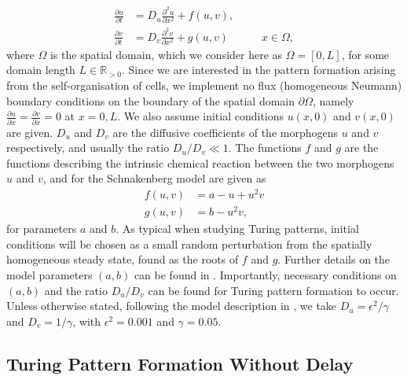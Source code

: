 \documentclass[12pt]{report}
\begin{document}
\begin{equation}\label{system}
    \begin{split}
    \frac{\partial u}{\partial t}&=D_u\frac{\partial^2 u}{\partial x^2}+f(u,v),\\
    \frac{\partial v}{\partial t}&=D_v\frac{\partial^2 v}{\partial x^2}+g(u,v) \quad\quad\quad x\in\Omega,
    \end{split}
\end{equation}
where $\Omega$ is the spatial domain, which we consider here as $\Omega=[0,L]$, for some domain length $L\in\mathbb{R}_{>0}$. Since we are interested in the pattern formation arising from the self-organisation of cells, we implement no flux (homogeneous Neumann) boundary conditions on the boundary of the spatial domain $\partial\Omega$, namely $\frac{\partial u}{\partial x}=\frac{\partial v}{\partial x}=0$ at $x=0, L$. We also assume initial conditions $u(x,0)$ and $v(x,0)$ are given. $D_u$ and $D_v$ are the diffusive coefficients of the morphogens $u$ and $v$ respectively, and usually the ratio $D_u/D_v\ll1$.
The functions $f$ and $g$ are the functions describing the intrinsic chemical reaction between the two morphogens $u$ and $v$, and for the Schnakenberg model are given as
\begin{equation}
    \begin{split}
        f(u,v)&=a-u+u^2v\\
        g(u,v)&=b-u^2v,
    \end{split}
\end{equation}
for parameters $a$ and $b$.
As typical when studying Turing patterns, initial conditions will be chosen as a small random perturbation from the spatially homogeneous steady state, found as the roots of $f$ and $g$. Further details on the model parameters $(a,b)$ can be found in \cite{gaffmonk}. Importantly, necessary conditions on $(a,b)$ and the ratio $D_u/D_v$ can be found for Turing pattern formation to occur. Unless otherwise stated, following the model description in \cite{gaffmonk}, we take $D_u=\epsilon^2/\gamma$ and $D_v=1/\gamma$, with $\epsilon^2=0.001$ and $\gamma=0.05$.


\subsection{Turing Pattern Formation Without Delay}
\end{document}
